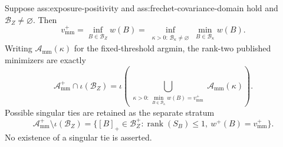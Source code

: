 Suppose ass:exposure-positivity and ass:frechet-covariance-domain hold and \(\mathcal B_Z\ne\varnothing\).  Then
\[
 v_{\mathrm{mm}}^+
 =\inf_{B\in\mathcal B_Z}w(B)
 =\inf_{\substack{\kappa>0:\,\mathcal B_\kappa\ne\varnothing}}
   \min_{B\in\mathcal B_\kappa}w(B).
\]
Writing \(\mathcal A_{\mathrm{mm}}(\kappa)\) for the fixed-threshold argmin, the rank-two published minimizers are exactly
\[
 \mathcal A_{\mathrm{mm}}^+\cap\iota(\mathcal B_Z)
 =\iota\!\left(
 \bigcup_{\substack{\kappa>0:\,
 \min_{B\in\mathcal B_\kappa}w(B)=v_{\mathrm{mm}}^+}}
 \mathcal A_{\mathrm{mm}}(\kappa)\right).
\]
Possible singular ties are retained as the separate stratum
\[
 \mathcal A_{\mathrm{mm}}^+\setminus\iota(\mathcal B_Z)
 =\{[B]_+\in\mathcal B_Z^+:\operatorname{rank}(S_B)\le1,\ w^+(B)=v_{\mathrm{mm}}^+\}.
\]
No existence of a singular tie is asserted.